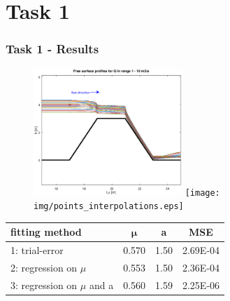 \documentclass[xcolor=dvipsnames, USenglish]{beamer}  %
\begin{document}
\section{Task 1}
  \begin{frame}
    \frametitle{Task 1 - Results}
    \centering
    \begin{figure}[t]
      \includegraphics[width=0.5\textwidth]{img/free_surfaces.eps}
      \texttt{[image: img/points\_interpolations.eps]}
    \end{figure}

    \begin{table}
    \centering
       \begin{tabular}{lccc}
       \toprule
       \textbf{fitting method} & $\boldsymbol{\mu}$ &  \textbf{a} & \textbf{MSE}\\
       \midrule
       1: trial-error & 0.570 & 1.50 & 2.69E-04\\
       2: regression on $\mu$ & 0.553 & 1.50 & 2.36E-04\\
       3: regression on $\mu$ and a & 0.560 & 1.59 & 2.25E-06\\
       \bottomrule
       \end{tabular}
    \end{table}
  \end{frame}

\end{document}
